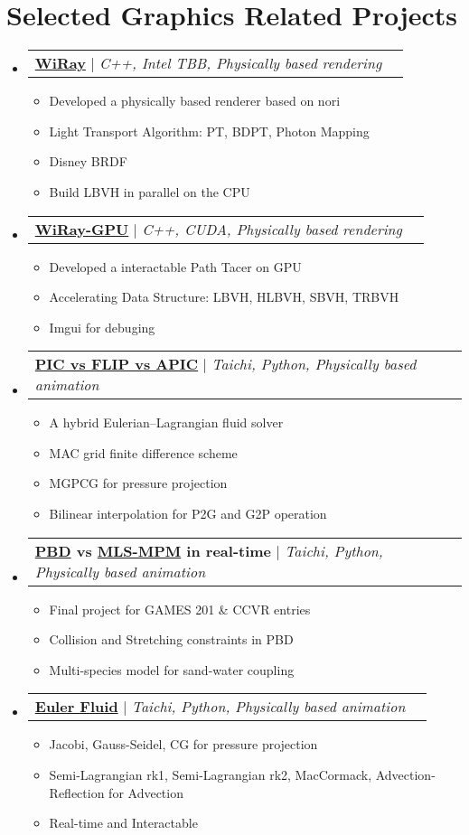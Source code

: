 \documentclass[letterpaper,11pt]{article}
\makeatletter
\newcommand{\resumeItem}[1]{
  \item\small{
    {#1 \vspace{-2pt}}
  }
}
\newcommand{\resumeProjectHeading}[2]{
    \item
    \begin{tabular*}{0.97\textwidth}{l@{\extracolsep{\fill}}r}
      \small#1 & #2 \\
    \end{tabular*}\vspace{-7pt}
}
\newcommand{\resumeSubHeadingListStart}{\begin{itemize}[leftmargin=0.15in, label={}]}
\newcommand{\resumeSubHeadingListEnd}{\end{itemize}}
\newcommand{\resumeItemListStart}{\begin{itemize}}
\newcommand{\resumeItemListEnd}{\end{itemize}\vspace{-5pt}}
\makeatother
\begin{document}
\section{Selected Graphics Related Projects}
    \resumeSubHeadingListStart
      \resumeProjectHeading
          {\href{https://github.com/Wimacs/WiRay}{\textbf{WiRay}} $|$ \emph{C++, Intel TBB, Physically based rendering}}{}
          \resumeItemListStart
            \resumeItem{Developed a physically based renderer based on nori}
            \resumeItem{Light Transport Algorithm: PT, BDPT, Photon Mapping}
            \resumeItem{Disney BRDF}
            \resumeItem{Build LBVH in parallel on the CPU}
          \resumeItemListEnd
      \resumeProjectHeading
          {\href{https://github.com/Wimacs/WiRay_GPU}{\textbf{WiRay-GPU}} $|$ \emph{C++, CUDA, Physically based rendering}}{}
          \resumeItemListStart
            \resumeItem{Developed a interactable Path Tacer on GPU}
            \resumeItem{Accelerating Data Structure: LBVH, HLBVH, SBVH, TRBVH}
            \resumeItem{Imgui for debuging}
            \resumeItemListEnd
       \resumeProjectHeading
          {\href{https://github.com/Wimacs/taichi_code/tree/master/apf}{\textbf{PIC vs FLIP vs APIC}} $|$ \emph{Taichi,  Python, Physically based animation}}{}
          \resumeItemListStart
            \resumeItem{A hybrid Eulerian–Lagrangian fluid solver}
            \resumeItem{MAC grid finite difference scheme}
            \resumeItem{MGPCG for pressure projection}
            \resumeItem{Bilinear interpolation for P2G and G2P operation}
           \resumeItemListEnd
        \resumeProjectHeading
          {\textbf{\href{https://github.com/Wimacs/taichi_code/tree/master/hw2}{\textbf{PBD}} vs \href{https://github.com/g1n0st/GAMES201/tree/master/hw2}{\textbf{MLS-MPM}} in real-time} $|$ \emph{Taichi,  Python, Physically based animation}}{}
          \resumeItemListStart
            \resumeItem{Final project for GAMES 201 \& CCVR entries}
            \resumeItem{Collision and Stretching constraints in PBD}
            \resumeItem{ Multi-species model for sand-water coupling}
           \resumeItemListEnd
         \resumeProjectHeading
          {\href{https://github.com/Wimacs/taichi_code/tree/master/fluid}{\textbf{Euler Fluid}} $|$ \emph{Taichi,  Python, Physically based animation}}{}
          \resumeItemListStart
            \resumeItem{Jacobi, Gauss-Seidel, CG for pressure projection}
            \resumeItem{Semi-Lagrangian rk1, Semi-Lagrangian rk2, MacCormack, Advection-Reflection for Advection}
            \resumeItem{ Real-time and Interactable}
           \resumeItemListEnd
    \resumeSubHeadingListEnd
\end{document}
